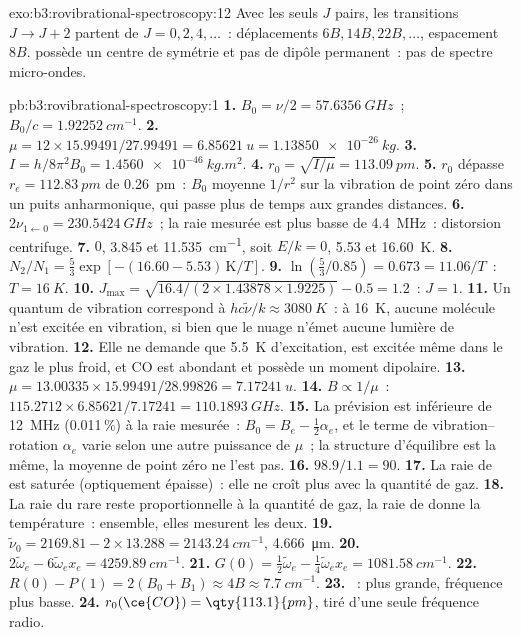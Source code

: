 \begin{solution}{exo:b3:rovibrational-spectroscopy:12}
Avec les seuls $J$ pairs, les transitions $J \to J + 2$ partent de
$J = 0, 2, 4, \dots$~: déplacements
$6B, 14B, 22B, \dots$, espacement $8B$.  possède un centre de
symétrie et pas de dipôle permanent~: pas de spectre micro-ondes.
\end{solution}

\begin{solution}{pb:b3:rovibrational-spectroscopy:1}
\textbf{1.} $B_0 = \nu/2 = \qty{57.6356}{GHz}$~; $B_0/c = \qty{1.92252}{cm^{-1}}$.
\textbf{2.} $\mu = 12 \times 15.99491/27.99491 = \qty{6.85621}{u} = \qty{1.13850e-26}{kg}$.
\textbf{3.} $I = h/8\pi^2B_0 = \qty{1.4560e-46}{kg.m^2}$.
\textbf{4.} $r_0 = \sqrt{I/\mu} = \qty{113.09}{pm}$.
\textbf{5.} $r_0$ dépasse $r_e = \qty{112.83}{pm}$ de \qty{0.26}{pm}~:
$B_0$ moyenne $1/r^2$
sur la vibration de point zéro dans un puits anharmonique, qui passe
plus de temps aux grandes distances.
\textbf{6.} $2\nu_{1\leftarrow0} = \qty{230.5424}{GHz}$~; la raie mesurée
est plus basse de \qty{4.4}{MHz}~:
distorsion centrifuge.
\textbf{7.} $0$, 3.845 et \qty{11.535}{cm^{-1}}, soit $E/k = 0$, 5.53 et \qty{16.60}{K}.
\textbf{8.} $N_2/N_1 = \frac53\exp[-(16.60 - 5.53)\,\mathrm K/T]$.
\textbf{9.} $\ln(\frac53/0.85) = 0.673 = 11.06/T$~: $T = \qty{16}{K}$.
\textbf{10.} $J_{\max} = \sqrt{16.4/(2 \times 1.43878 \times 1.9225)} - 0.5 = 1.2$~: $J = 1$.
\textbf{11.} Un quantum de vibration correspond à $hc\tilde\nu/k \approx \qty{3080}{K}$~: à
\qty{16}{K}, aucune molécule n'est excitée en vibration, si bien que le
nuage n'émet aucune lumière de vibration.
\textbf{12.} Elle ne demande que \qty{5.5}{K} d'excitation, est excitée
même dans le gaz le plus froid, et CO est abondant et possède un moment
dipolaire.
\textbf{13.} $\mu = 13.00335 \times 15.99491/28.99826 = \qty{7.17241}{u}$.
\textbf{14.} $B \propto 1/\mu$~: $115.2712 \times 6.85621/7.17241 = \qty{110.1893}{GHz}$.
\textbf{15.} La prévision est inférieure de \qty{12}{MHz} (0.011\,\%) à
la raie mesurée~: $B_0 = B_e - \frac12\alpha_e$, et le terme de
vibration--rotation $\alpha_e$ varie selon une autre puissance de
$\mu$~; la structure d'équilibre est la même, la moyenne de point zéro ne
l'est pas.
\textbf{16.} $98.9/1.1 = 90$.
\textbf{17.} La raie de  est saturée (optiquement
épaisse)~: elle ne croît plus avec la quantité de gaz.
\textbf{18.} La raie du rare  reste proportionnelle à
la quantité de gaz, la raie de
 donne la température~: ensemble, elles mesurent les
deux.
\textbf{19.} $\tilde\nu_0 = 2169.81 - 2 \times 13.288 = \qty{2143.24}{cm^{-1}}$, \qty{4.666}{\micro m}.
\textbf{20.} $2\tilde\omega_e - 6\tilde\omega_ex_e = \qty{4259.89}{cm^{-1}}$.
\textbf{21.} $G(0) = \frac12\tilde\omega_e - \frac14\tilde\omega_ex_e = \qty{1081.58}{cm^{-1}}$.
\textbf{22.} $R(0) - P(1) = 2(B_0 + B_1) \approx 4B \approx \qty{7.7}{cm^{-1}}$.
\textbf{23.} ~:  plus grande, fréquence plus
basse.
\textbf{24.} \textbf{$r_0(\ce{CO}) = \qty{113.1}{pm}$}, tiré d'une seule
fréquence radio.
\end{solution}
